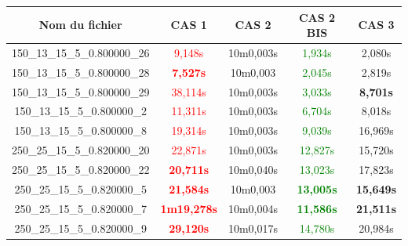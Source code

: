 \documentclass[a4paper, 10pt]{article}
\begin{document}
        \hfill
       \begin{minipage}[t]{0.6\linewidth}
         \footnotesize
           \begin{tabular}{ |c|c|c|c|c| }
             \hline
             \textbf{Nom du fichier} & \textbf{CAS 1} &\textcolor[gray]{0.6}{ \textbf{CAS 2}} & \textbf{CAS 2 BIS} & \textbf{CAS 3} \\
             \hline
             \scriptsize{150\_13\_15\_5\_0.800000\_26} & \textcolor{red}{9,148s} & \textcolor[gray]{0.6}{10m0,003s} & \textcolor{green}{1,934s} & 2,080s\\
             \hline
             \scriptsize{150\_13\_15\_5\_0.800000\_28} & \textbf{\textcolor{red}{7,527s}} & \textcolor[gray]{0.6}{10m0,003 }& \textcolor{green}{2,045s} & 2,819s \\
             \hline
             \scriptsize{150\_13\_15\_5\_0.800000\_29} & \textcolor{red}{38,114s} & \textcolor[gray]{0.6}{10m0,003s} & \textcolor{green}{3,033s} & \textbf{8,701s} \\
             \hline
             \scriptsize{150\_13\_15\_5\_0.800000\_2} & \textcolor{red}{11,311s} & \textcolor[gray]{0.6}{10m0,003s} & \textcolor{green}{6,704s} & 8,018s \\
             \hline
             \scriptsize{150\_13\_15\_5\_0.800000\_8} & \textcolor{red}{19,314s} & \textcolor[gray]{0.6}{10m0,003s} & \textcolor{green}{9,039s} & 16,969s \\
             \hline
             \scriptsize{250\_25\_15\_5\_0.820000\_20} & \textcolor{red}{22,871s} & \textcolor[gray]{0.6}{10m0,003s} & \textcolor{green}{12,827s} & 15,720s \\
             \hline
             \scriptsize{250\_25\_15\_5\_0.820000\_22} & \textbf{\textcolor{red}{20,711s}} & \textcolor[gray]{0.6}{10m0,040s} & \textcolor{green}{13,023s} & 17,823s \\
             \hline
             \scriptsize{250\_25\_15\_5\_0.820000\_5} & \textbf{\textcolor{red}{21,584s}} & \textcolor[gray]{0.6}{10m0,003 }& \textbf{\textcolor{green}{13,005s}} & \textbf{15,649s} \\
             \hline
             \scriptsize{250\_25\_15\_5\_0.820000\_7} & \textbf{\textcolor{red}{1m19,278s}}& \textcolor[gray]{0.6}{10m0,004s} &\textbf{ \textcolor{green}{11,586s}} & \textbf{21,511s} \\
             \hline
             \scriptsize{250\_25\_15\_5\_0.820000\_9} & \textbf{\textcolor{red}{29,120s}} & \textcolor[gray]{0.6}{10m0,017s} & \textcolor{green}{14,780s} & 20,984s \\

\end{tabular}
\end{minipage}
\end{document}
